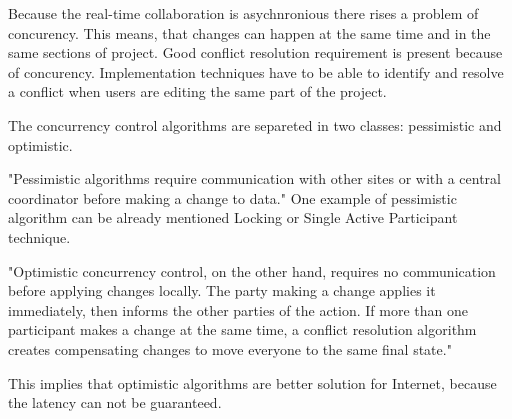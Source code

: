 \documentclass[12pt,oneside]{fithesis2}
\begin{document}
\par Because the real-time collaboration is asychnronious there rises a problem of concurency. This means, that changes can happen at the same time and in the same sections of project. Good conflict resolution requirement is present because of concurency. Implementation techniques have to be able to identify and resolve a conflict when users are editing the same part of the project. \par The concurrency control algorithms are separeted in two classes: pessimistic and optimistic. \par "Pessimistic algorithms require communication with other sites or with a central coordinator before making a change to data." \cite{Jupiter} One example of pessimistic algorithm can be already mentioned Locking or Single Active Participant technique. \par "Optimistic concurrency control, on the other hand, requires no communication before applying changes locally. The party making a change applies it immediately, then informs the other parties of the action. If more than one participant makes a change at the same time, a conflict resolution algorithm creates compensating changes to move everyone to the same final state." \cite{Jupiter} \par This implies that optimistic algorithms are better solution for Internet, because the latency can not be guaranteed. 
\end{document}
